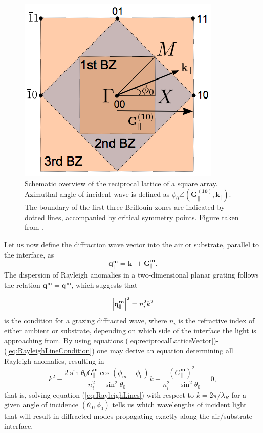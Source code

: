 \begin{figure}
    \centering
    \includegraphics[scale=0.45]{figures/Ch2/ReciprocalLattice.png}
    \caption{Schematic overview of the reciprocal lattice of a square array. Azimuthal angle of incident wave is defined as $\phi_0\angle(\mathbf{G_\parallel^{(10)}},\mathbf{k}_\parallel)$. The boundary of the first three Brillouin zones are indicated by dotted lines, accompanied by critical symmetry points. Figure taken from \cite{Brakstad:15}.}
    \label{fig:reciprocallattice}
\end{figure}

Let us now define the diffraction wave vector into the air or substrate, parallel to the interface, as \cite{KretschmannMaradudin}
\begin{equation}
    \mathbf{q}_\parallel^\mathbf{m} = \mathbf{k}_\parallel + \mathbf{G}_\parallel^\mathbf{m}.
    \label{eq:RayleighDiffractedBeam}
\end{equation}
The dispersion of Rayleigh anomalies in a two-dimensional planar grating follows the relation $\mathbf{q}_\parallel^\mathbf{m} = \mathbf{q}^\mathbf{m}$, which suggests that 
\begin{equation}
    \left| \mathbf{q}_\parallel^\mathbf{m} \right|^2 = n_i^2 k^2
    \label{eq:RayleighLineCondition}
\end{equation}
is the condition for a grazing diffracted wave, where $n_i$ is the refractive index of either ambient or substrate, depending on which side of the interface the light is approaching from. By using equations (\ref{eq:reciprocalLatticeVector})-(\ref{eq:RayleighLineCondition}) one may derive an equation determining all Rayleigh anomalies, resulting in \cite{Brakstad:15}
\begin{equation}
    k^2 - \frac{2\sin\theta_0G_\parallel^\mathbf{m}\cos(\phi_m-\phi_0)}{n_i^2-\sin^2\theta_0}k - \frac{(G_\parallel^\mathbf{m})^2}{n_i^2-\sin^2\theta_0} = 0,
    \label{eq:RayleighLines}
\end{equation}
that is, solving equation (\ref{eq:RayleighLines}) with respect to $k=2\pi/\lambda_R$ for a given angle of incidence $(\theta_0,\phi_0)$ tells us which wavelengths of incident light that will result in diffracted modes propagating exactly along the air/substrate interface. 

